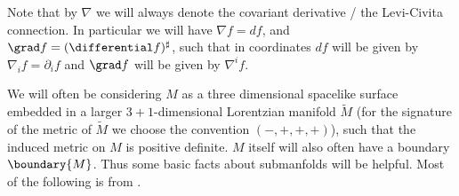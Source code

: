 \documentclass[titlepage,numbers=noenddot,headinclude,oneside,%
footinclude=true,cleardoublepage=empty,%
BCOR=5mm,paper=a4,fontsize=11pt,%
english,%
]{scrartcl}
\begin{document}
Note that by \( \nabla \) we will always denote the covariant derivative / the Levi-Civita connection. In particular we will have \( \nabla f=df \), and \( \grad f=(\differential f)^\sharp \), such that in coordinates \( df \) will be given by \( \nabla_i f=\partial_i f \) and \( \grad f \) will be given by \( \nabla^i f \).

We will often be considering \( M \) as a three dimensional spacelike surface embedded in a larger \( 3+1 \)-dimensional Lorentzian manifold \( \tilde{M} \) (for the signature of the metric of \( \tilde{M} \) we choose the convention \( (-,+,+,+) \)), such that the induced metric on \( M \) is positive definite. \( M \) itself will also often have a boundary \( \boundary{M} \). Thus some basic facts about submanfolds will be helpful. Most of the following is from \cite[Chapter~2.1]{leeGeometricRelativity2019}.
\end{document}
